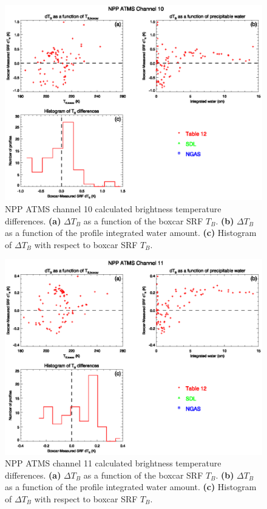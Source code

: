 \begin{figure}[H]
  \centering
  \includegraphics[scale=1]{graphics/dtb/atms_npp.ch10.TbStats.eps}
  \caption{NPP ATMS channel 10 calculated brightness temperature differences. \textbf{(a)} $\Delta T_B$ as a function of the boxcar SRF $T_B$. \textbf{(b)} $\Delta T_B$ as a function of the profile integrated water amount. \textbf{(c)} Histogram of $\Delta T_B$ with respect to boxcar SRF $T_B$.}
  \label{fig:atms_npp.ch10.dtb}
\end{figure}

\begin{figure}[H]
  \centering
  \includegraphics[scale=1]{graphics/dtb/atms_npp.ch11.TbStats.eps}
  \caption{NPP ATMS channel 11 calculated brightness temperature differences. \textbf{(a)} $\Delta T_B$ as a function of the boxcar SRF $T_B$. \textbf{(b)} $\Delta T_B$ as a function of the profile integrated water amount. \textbf{(c)} Histogram of $\Delta T_B$ with respect to boxcar SRF $T_B$.}
  \label{fig:atms_npp.ch11.dtb}
\end{figure}

